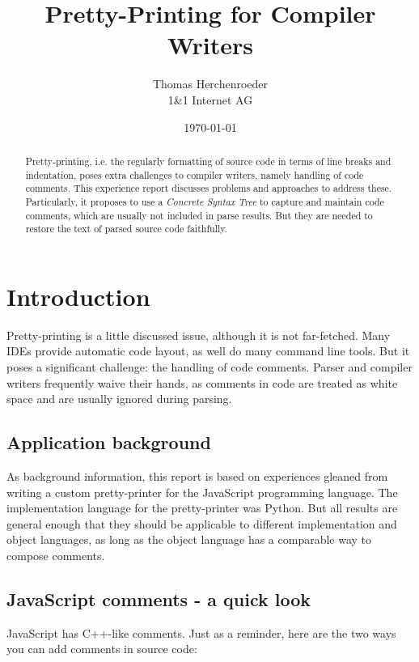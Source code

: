 \documentclass[11pt,a4paper]{article}
\begin{document}
\title{Pretty-Printing for Compiler Writers}
\author{
Thomas Herchenroeder\\
1\&1 Internet AG
}

\date{\today}
\maketitle

\begin{abstract} 
Pretty-printing, i.e. the regularly formatting of source code
in terms of line breaks and indentation, poses extra challenges to compiler
writers, namely handling of code comments. This experience report discusses problems and
approaches to address these. Particularly, it proposes to use a \emph{Concrete
Syntax Tree} to capture and maintain code comments, which are usually not
included in parse results. But they are needed to restore the text of parsed
source code faithfully.
\end{abstract}

\section{Introduction}
Pretty-printing is a little discussed issue, although it is not
far-fetched. Many IDEs provide automatic code layout, as well do many command
line tools. But it poses a significant
challenge: the handling of code comments. Parser and compiler writers
frequently waive their hands, as comments in code are treated as white space and
are usually ignored during parsing.

\subsection{Application background}

As background information, this report is based on experiences gleaned from
writing a custom pretty-printer for the JavaScript programming language. The
implementation language for the pretty-printer was Python. But all results are
general enough that they should be applicable to different implementation and
object languages, as long as the object language has a comparable way to compose
comments.

\subsection{JavaScript comments - a quick look}

JavaScript has C++-like comments. Just as a reminder, here are the two ways you
can add comments in source code:
\end{document}
